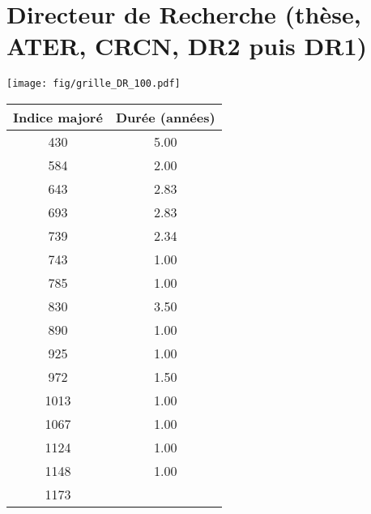 \chapter{Directeur de Recherche (thèse, ATER, CRCN, DR2 puis DR1)} 

\begin{minipage}{0.55\linewidth}\texttt{[image: fig/grille\_DR\_100.pdf]}\end{minipage} 
\begin{minipage}{0.3\linewidth} 
 \begin{center} 

\begin{tabular}[htb]{|c|c|} 
\hline 
 Indice majoré &  Durée (années) \\ 
\hline \hline 
 430 &  5.00 \\ 
\hline 
 584 &  2.00 \\ 
\hline 
 643 &  2.83 \\ 
\hline 
 693 &  2.83 \\ 
\hline 
 739 &  2.34 \\ 
\hline 
 743 &  1.00 \\ 
\hline 
 785 &  1.00 \\ 
\hline 
 830 &  3.50 \\ 
\hline 
 890 &  1.00 \\ 
\hline 
 925 &  1.00 \\ 
\hline 
 972 &  1.50 \\ 
\hline 
 1013 &  1.00 \\ 
\hline 
 1067 &  1.00 \\ 
\hline 
 1124 &  1.00 \\ 
\hline 
 1148 &  1.00 \\ 
\hline 
 1173 &   \\ 
\hline 
\hline 
\end{tabular} 
\end{center} 
 \end{minipage} 

~\\ 
 


   
 \localtableofcontents 

~\\ 
 
